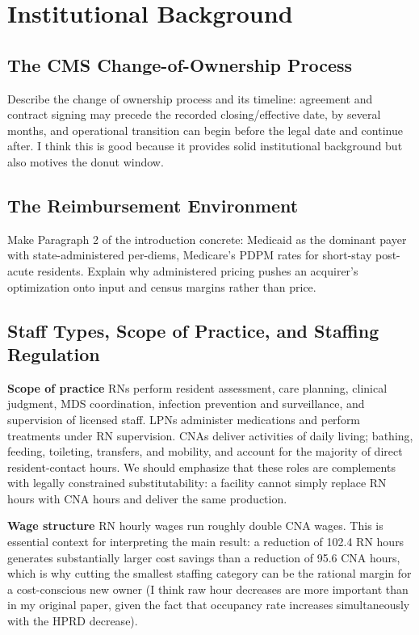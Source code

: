 \documentclass[12pt]{article}
\begin{document}
\section{Institutional Background} \label{sec:background}

\subsection{The CMS Change-of-Ownership Process} \label{sec:background-chow}

Describe the change of ownership process and its timeline: agreement and contract signing may precede the recorded closing/effective date, by several months, and operational transition can begin before the legal date and continue after. I think this is good because it provides solid institutional background but also motives the donut window.

\subsection{The Reimbursement Environment} \label{sec:background-reimbursement}

Make Paragraph 2 of the introduction concrete: Medicaid as the dominant payer with state-administered per-diems, Medicare's PDPM rates for short-stay post-acute residents. Explain why administered pricing pushes an acquirer's optimization onto input and census margins rather than price.

\subsection{Staff Types, Scope of Practice, and Staffing Regulation} \label{sec:background-staffing}

\noindent\textbf{Scope of practice} RNs perform resident assessment, care planning, clinical judgment, MDS coordination, infection prevention and surveillance, and supervision of licensed staff. LPNs administer medications and perform treatments under RN supervision. CNAs deliver activities of daily living; bathing, feeding, toileting, transfers, and mobility, and account for the majority of direct resident-contact hours. We should emphasize that these roles are complements with legally constrained substitutability: a facility cannot simply replace RN hours with CNA hours and deliver the same production.

\medskip
\noindent\textbf{Wage structure} RN hourly wages run roughly double CNA wages. This is essential context for interpreting the main result: a reduction of 102.4 RN hours generates substantially larger cost savings than a reduction of 95.6 CNA hours, which is why cutting the smallest staffing category can be the rational margin for a cost-conscious new owner (I think raw hour decreases are more important than in my original paper, given the fact that occupancy rate increases simultaneously with the HPRD decrease).
\end{document}
